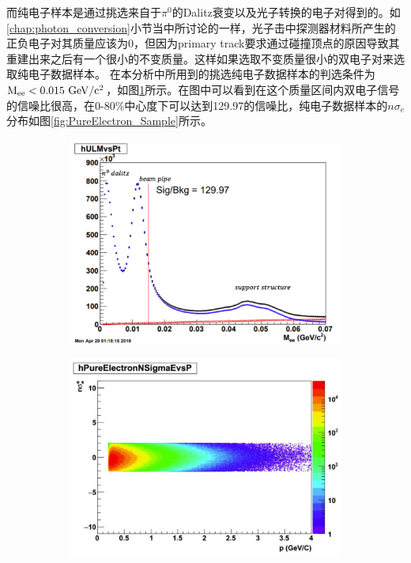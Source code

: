 而纯电子样本是通过挑选来自于$\pi^0$的Dalitz衰变以及光子转换的电子对得到的。如\ref{chap:photon_conversion}小节当中所讨论的一样，光子击中探测器材料所产生的正负电子对其质量应该为0，但因为primary track要求通过碰撞顶点的原因导致其重建出来之后有一个很小的不变质量。这样如果选取不变质量很小的双电子对来选取纯电子数据样本。
在本分析中所用到的挑选纯电子数据样本的判选条件为$\rm{M_{ee} < 0.015~GeV/c^2}$，如图\ref{fig:PureElectron_cut}所示。在图中可以看到在这个质量区间内双电子信号的信噪比很高，在0-80\%中心度下可以达到129.97的信噪比，纯电子数据样本的$n\sigma_e$分布如图\ref{fig:PureElectron_Sample}所示。

\begin{figure}[h!]
    \centering
    \begin{subfigure}[h!]{0.45\textwidth}
            \includegraphics[width=\textwidth]{figures/Chapter4/PureElectron_cut.png}
            \caption{}
            \label{fig:PureElectron_cut}
    \end{subfigure}
    \begin{subfigure}[h!]{0.45\textwidth}
            \includegraphics[width=\textwidth]{figures/Chapter4/PureElectron_Sample.png}

\end{subfigure}
\end{figure}
